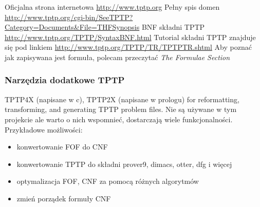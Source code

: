 \documentclass[a4paper,12pt]{article}
\begin{document}


\noindent
Oficjalna strona internetowa \url{http://www.tptp.org}
\newline
Pełny spis domen \url{http://www.tptp.org/cgi-bin/SeeTPTP?Category=Documents&File=THFSynopsis}
\newline
BNF składni TPTP \url{http://www.tptp.org/TPTP/SyntaxBNF.html}
\newline
Tutorial składni TPTP znajduje się pod linkiem \url{http://www.tptp.org/TPTP/TR/TPTPTR.shtml} Aby poznać jak zapisywana jest formuła, polecam przeczytać \textit{The Formulae Section}

\subsubsection{Narzędzia dodatkowe TPTP}

TPTP4X (napisane w c), TPTP2X (napisane w prologu) for reformatting, transforming, and generating TPTP problem files. Nie są używane w tym projekcie ale warto o nich wspomnieć, dostarczają wiele funkcjonalności.
Przykładowe możliwości:

\begin{itemize}
  \item konwertowanie \gls{FOF} do \gls{CNF}
  \item konwertowanie TPTP do składni prover9, dimacs, otter, dfg i więcej
  \item optymalizacja \gls{FOF}, \gls{CNF} za pomocą różnych algorytmów
  \item zmień porządek formuły \gls{CNF}
\end{itemize}
\end{document}
